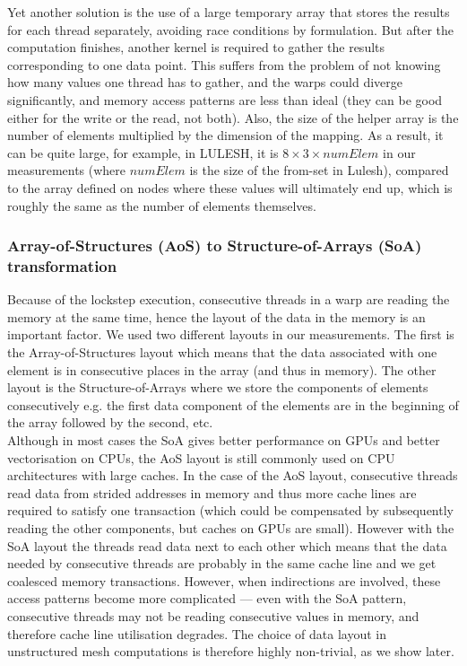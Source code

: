 Yet another solution is the use of a large temporary array that stores the
results for each thread separately, avoiding race conditions by formulation. But
after the computation finishes, another kernel is required to gather the results
corresponding to one data point. This suffers from the problem of not knowing
how many values one thread has to gather, and the warps could diverge
significantly, and memory access patterns are less than ideal (they can be good
either for the write or the read, not both). Also, the size of the helper array
is the number of elements multiplied by the dimension of the mapping. As a
result, it can be quite large, for example, in LULESH, it is \(8 \times 3 \times
numElem \) in our measurements (where $numElem$ is the size of the from-set in
Lulesh), compared to the array defined on nodes where these values will
ultimately end up, which is roughly the same as the number of elements
themselves.

\subsubsection{Array-of-Structures (AoS) to Structure-of-Arrays (SoA)
transformation} \label{aos-to-soa}
Because of the lockstep execution, consecutive threads in a warp are reading the
memory at the same time, hence the layout of the data in the memory is an
important factor. We used two different layouts in our measurements. The first
is the Array-of-Structures layout which means that the data associated with one
element is in consecutive places in the array (and thus in memory). The other
layout is the Structure-of-Arrays where we store the components of elements
consecutively e.g.  the first data component of the elements are in the
beginning of the array followed by the second, etc.\\
Although in most cases the SoA gives better performance on GPUs and better
vectorisation on CPUs, the AoS layout is still commonly used on CPU
architectures with large caches. In the case of the AoS layout, consecutive
threads read data from strided addresses in memory and thus more cache lines are
required to satisfy one transaction (which could be compensated by subsequently
reading the other components, but caches on GPUs are small). However with the
SoA layout the threads read data next to each other which means that the data
needed by consecutive threads are probably in the same cache line and we get
coalesced memory transactions. However, when indirections are involved, these
access patterns become more complicated --- even with the SoA pattern,
consecutive threads may not be reading consecutive values in memory, and
therefore cache line utilisation degrades. The choice of data layout in
unstructured mesh computations is therefore highly non-trivial, as we show
later.

